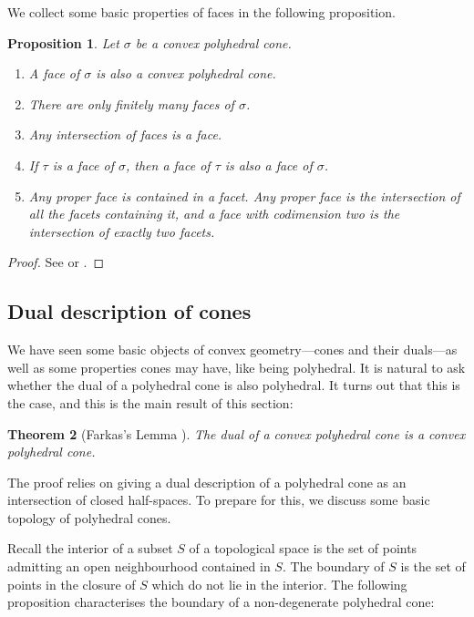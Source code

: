 \documentclass[12pt]{amsart}
\theoremstyle{plain}
\newtheorem{theorem}{Theorem}[subsection]
\newtheorem{proposition}[theorem]{Proposition}
\begin{document}
We collect some basic properties of faces in the following proposition.

\begin{proposition}
Let $\sigma$ be a convex polyhedral cone.
\begin{enumerate}
\item A face of $\sigma$ is also a convex polyhedral cone.
\item There are only finitely many faces of $\sigma$.
\item Any intersection of faces is a face.
\item If $\tau$ is a face of $\sigma$, then a face of $\tau$ is also a face of $\sigma$.
\item Any proper face is contained in a facet.
Any proper face is the intersection of all the facets containing it, and a face with codimension two is the intersection of exactly two facets.
\end{enumerate}
\end{proposition}
\begin{proof}
See \cite[\S 1.2]{Fulton93} or \cite[\S 1]{Zaman13}.
\end{proof}





\subsection{Dual description of cones}\label{section:dualdescription}
We have seen some basic objects of convex geometry---cones and their duals---as well as some properties cones may have, like being polyhedral.
It is natural to ask whether the dual of a polyhedral cone is also polyhedral.
It turns out that this is the case, and this is the main result of this section:

\begin{theorem}[{Farkas's Lemma \cite[\S 1.2]{Fulton93}}]\label{theorem:farkas}
The dual of a convex polyhedral cone is a convex polyhedral cone.
\end{theorem}

The proof relies on giving a dual description of a polyhedral cone as an intersection of closed half-spaces.
To prepare for this, we discuss some basic topology of polyhedral cones.

Recall the interior of a subset $S$ of a topological space is the set of points admitting an open neighbourhood contained in $S$.
The boundary of $S$ is the set of points in the closure of $S$ which do not lie in the interior.
The following proposition characterises the boundary of a non-degenerate polyhedral cone:
\end{document}
